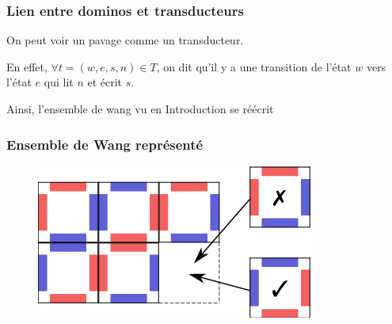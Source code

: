 \documentclass{beamer}
\begin{document}
\begin{frame}
\frametitle{Lien entre dominos et transducteurs}

On peut voir un pavage comme un transducteur.

En effet, $\forall t = (w,e,s,n) \in T$, on dit qu'il y a une transition de l'état $w$ vers l'état $e$ qui lit $n$ et écrit $s$.

Ainsi, l'ensemble de wang vu en Introduction se réécrit

\begin{center}


\end{center}

\end{frame}

\begin{frame}
\frametitle{Ensemble de Wang représenté}

\begin{figure}

    \includegraphics[scale = 0.5]{pavage_periodique}
    \centering
    
\end{figure}

\end{frame}
\end{document}
